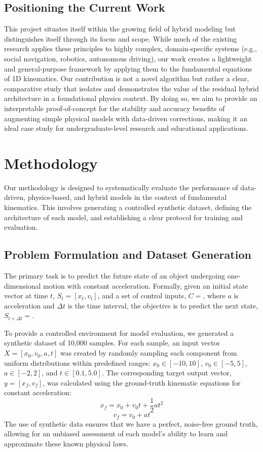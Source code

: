 \documentclass[conference]{IEEEtran}
\begin{document}
\subsection{Positioning the Current Work}
This project situates itself within the growing field of hybrid modeling but distinguishes itself through its focus and scope. While much of the existing research applies these principles to highly complex, domain-specific systems (e.g., social navigation, robotics, autonomous driving), our work creates a lightweight and general-purpose framework by applying them to the fundamental equations of 1D kinematics. Our contribution is not a novel algorithm but rather a clear, comparative study that isolates and demonstrates the value of the residual hybrid architecture in a foundational physics context. By doing so, we aim to provide an interpretable proof-of-concept for the stability and accuracy benefits of augmenting simple physical models with data-driven corrections, making it an ideal case study for undergraduate-level research and educational applications.

\section{Methodology}
Our methodology is designed to systematically evaluate the performance of data-driven, physics-based, and hybrid models in the context of fundamental kinematics. This involves generating a controlled synthetic dataset, defining the architecture of each model, and establishing a clear protocol for training and evaluation.

\subsection{Problem Formulation and Dataset Generation}
The primary task is to predict the future state of an object undergoing one-dimensional motion with constant acceleration. Formally, given an initial state vector at time $t$, $S_t = [x_t, v_t]$, and a set of control inputs, $C =$, where $a$ is acceleration and $\Delta t$ is the time interval, the objective is to predict the next state, $S_{t+\Delta t} =$.

To provide a controlled environment for model evaluation, we generated a synthetic dataset of 10,000 samples. For each sample, an input vector $X = [x_0, v_0, a, t]$ was created by randomly sampling each component from uniform distributions within predefined ranges: $x_0 \in [-10, 10]$, $v_0 \in [-5, 5]$, $a \in [-2, 2]$, and $t \in [0.1, 5.0]$. The corresponding target output vector, $y = [x_f, v_f]$, was calculated using the ground-truth kinematic equations for constant acceleration:
\begin{equation}
x_f = x_0 + v_0t + \frac{1}{2}at^2
\label{eq:pos}
\end{equation}
\begin{equation}
v_f = v_0 + at
\label{eq:vel}
\end{equation}
The use of synthetic data ensures that we have a perfect, noise-free ground truth, allowing for an unbiased assessment of each model's ability to learn and approximate these known physical laws.
\end{document}
